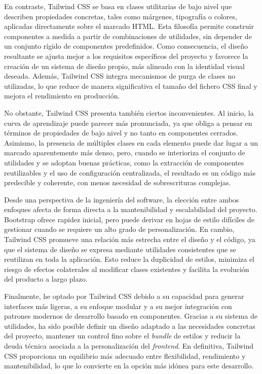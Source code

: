 En contraste, Tailwind CSS se basa en clases utilitarias de bajo nivel que describen propiedades concretas, tales como márgenes, tipografía o colores, aplicadas directamente sobre el marcado HTML. Esta filosofía permite construir componentes a medida a partir de combinaciones de utilidades, sin depender de un conjunto rígido de componentes predefinidos. Como consecuencia, el diseño resultante se ajusta mejor a los requisitos específicos del proyecto y favorece la creación de un sistema de diseño propio, más alineado con la identidad visual deseada. Además, Tailwind CSS integra mecanismos de purga de clases no utilizadas, lo que reduce de manera significativa el tamaño del fichero CSS final y mejora el rendimiento en producción.

No obstante, Tailwind CSS presenta también ciertos inconvenientes. Al inicio, la curva de aprendizaje puede parecer más pronunciada, ya que obliga a pensar en términos de propiedades de bajo nivel y no tanto en componentes cerrados. Asimismo, la presencia de múltiples clases en cada elemento puede dar lugar a un marcado aparentemente más denso, pero, cuando se interioriza el conjunto de utilidades y se adoptan buenas prácticas, como la extracción de componentes reutilizables y el uso de configuración centralizada, el resultado es un código más predecible y coherente, con menos necesidad de sobrescrituras complejas.

Desde una perspectiva de la ingeniería del software, la elección entre ambos enfoques afecta de forma directa a la mantenibilidad y escalabilidad del proyecto. Bootstrap ofrece rapidez inicial, pero puede derivar en hojas de estilo difíciles de gestionar cuando se requiere un alto grado de personalización. En cambio, Tailwind CSS promueve una relación más estrecha entre el diseño y el código, ya que el sistema de diseño se expresa mediante utilidades consistentes que se reutilizan en toda la aplicación. Esto reduce la duplicidad de estilos, minimiza el riesgo de efectos colaterales al modificar clases existentes y facilita la evolución del producto a largo plazo.

Finalmente, he optado por Tailwind CSS debido a su capacidad para generar interfaces más ligeras, a su enfoque modular y a su mejor integración con patrones modernos de desarrollo basado en componentes. Gracias a su sistema de utilidades, ha sido posible definir un diseño adaptado a las necesidades concretas del proyecto, mantener un control fino sobre el \textit{bundle} de estilos y reducir la deuda técnica asociada a la personalización del \textit{frontend}. En definitiva, Tailwind CSS proporciona un equilibrio más adecuado entre flexibilidad, rendimiento y mantenibilidad, lo que lo convierte en la opción más idónea para este desarrollo.

